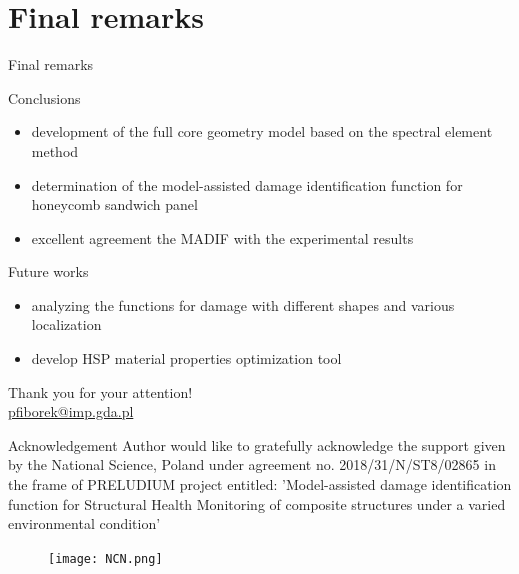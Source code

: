 \documentclass[10pt,aspectratio=169]{beamer} %
\begin{document}
\section{Final remarks}
\begin{frame}[label=frame24]{Final remarks}
	\begin{alertblock}{Conclusions}
		\begin{itemize}
			\item development of the full core geometry model based on the spectral element method
			\item determination of the model-assisted damage identification function for honeycomb sandwich panel
			\item excellent agreement the MADIF with the experimental results
		\end{itemize}
	\end{alertblock}
\begin{alertblock}{Future works}
	\begin{itemize}
		\item analyzing the functions for damage with different shapes and various localization
		\item develop HSP material properties optimization tool
	\end{itemize}
\end{alertblock}
\end{frame}
{
	\begin{frame}[standout]
		Thank you for your attention!\\ \vspace{12pt}
		\scriptsize{\url{pfiborek@imp.gda.pl}}
		\begin{block}{Acknowledgement}
			\tiny
			Author would like to gratefully acknowledge the support given by the National Science, Poland under agreement no. 2018/31/N/ST8/02865 in the frame of PRELUDIUM project entitled: 'Model-assisted damage identification function for Structural Health Monitoring of composite structures under a varied environmental condition'
			\begin{figure}
				\texttt{[image: NCN.png]}
				\label{fig:NCN}
			\end{figure}
		\end{block}
	\end{frame}
}
\end{document}
